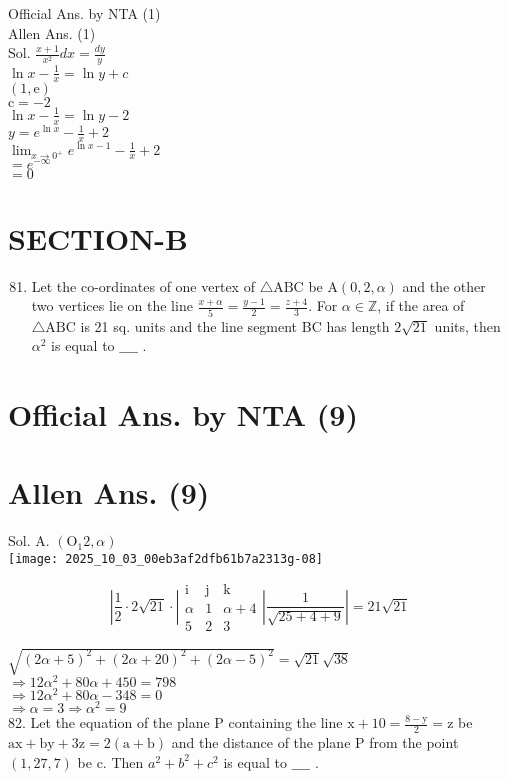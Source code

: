 \documentclass[10pt]{article}
\begin{document}
Official Ans. by NTA (1)\\
Allen Ans. (1)\\
Sol. \(\frac{x+1}{x^{2}} d x=\frac{d y}{y}\)\\
\(\ln x-\frac{1}{x}=\ln y+c\)\\
\((1, \mathrm{e})\)\\
\(\mathrm{c}=-2\)\\
\(\ln x-\frac{1}{x}=\ln y-2\)\\
\(y=e^{\ln x}-\frac{1}{x}+2\)\\
\(\lim _{x \rightarrow 0^{+}} e^{\ln x-1}-\frac{1}{x}+2\)\\
\(=e^{-\infty}\)\\
\(=0\)

\section*{SECTION-B}
\begin{enumerate}
  \setcounter{enumi}{80}
  \item Let the co-ordinates of one vertex of \(\triangle \mathrm{ABC}\) be \(\mathrm{A}(0,2, \alpha)\) and the other two vertices lie on the line \(\frac{x+\alpha}{5}=\frac{y-1}{2}=\frac{z+4}{3}\). For \(\alpha \in \mathbb{Z}\), if the area of \(\triangle \mathrm{ABC}\) is 21 sq. units and the line segment BC has length \(2 \sqrt{21}\) units, then \(\alpha^{2}\) is equal to \(\_\_\_\_\) .
\end{enumerate}

\section*{Official Ans. by NTA (9)}
\section*{Allen Ans. (9)}
Sol. A. \(\left(\mathrm{O}_{1} 2, \alpha\right)\)\\
\texttt{[image: 2025\_10\_03\_00eb3af2dfb61b7a2313g-08]}

\[
\left|\frac{1}{2} \cdot 2 \sqrt{21} \cdot\right| \begin{array}{ccc}
\mathrm{i} & \mathrm{j} & \mathrm{k} \\
\alpha & 1 & \alpha+4 \\
5 & 2 & 3
\end{array}\left|\frac{1}{\sqrt{25+4+9}}\right|=21 \sqrt{21}
\]

\(\sqrt{(2 \alpha+5)^{2}+(2 \alpha+20)^{2}+(2 \alpha-5)^{2}}=\sqrt{21} \sqrt{38}\)\\
\(\Rightarrow 12 \alpha^{2}+80 \alpha+450=798\)\\
\(\Rightarrow 12 \alpha^{2}+80 \alpha-348=0\)\\
\(\Rightarrow \alpha=3 \Rightarrow \alpha^{2}=9\)\\
82. Let the equation of the plane P containing the line \(\mathrm{x}+10=\frac{8-\mathrm{y}}{2}=\mathrm{z}\) be \(\mathrm{ax}+\mathrm{by}+3 \mathrm{z}=2(\mathrm{a}+\mathrm{b})\) and the distance of the plane P from the point \((1,27,7)\) be c. Then \(a^{2}+b^{2}+c^{2}\) is equal to \(\_\_\_\_\) .
\end{document}
